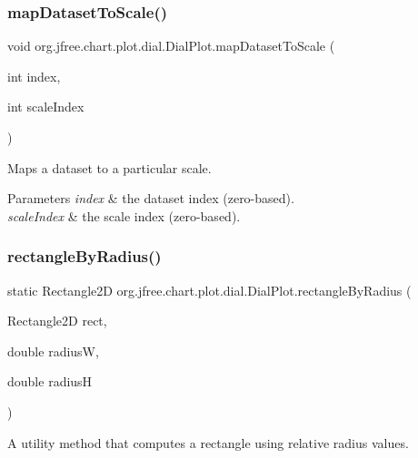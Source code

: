 \subsubsection{\texorpdfstring{map\+Dataset\+To\+Scale()}{mapDatasetToScale()}}
{\footnotesize\ttfamily void org.\+jfree.\+chart.\+plot.\+dial.\+Dial\+Plot.\+map\+Dataset\+To\+Scale (\begin{DoxyParamCaption}\item[{int}]{index,  }\item[{int}]{scale\+Index }\end{DoxyParamCaption})}

Maps a dataset to a particular scale.


\begin{DoxyParams}{Parameters}
{\em index} & the dataset index (zero-\/based). \\
\hline
{\em scale\+Index} & the scale index (zero-\/based). \\
\hline
\end{DoxyParams}
\mbox{\label{classorg_1_1jfree_1_1chart_1_1plot_1_1dial_1_1_dial_plot_ac83736934eac0d509bc7989539196055}} 
\subsubsection{\texorpdfstring{rectangle\+By\+Radius()}{rectangleByRadius()}}
{\footnotesize\ttfamily static Rectangle2D org.\+jfree.\+chart.\+plot.\+dial.\+Dial\+Plot.\+rectangle\+By\+Radius (\begin{DoxyParamCaption}\item[{Rectangle2D}]{rect,  }\item[{double}]{radiusW,  }\item[{double}]{radiusH }\end{DoxyParamCaption})\hspace{0.3cm}{\ttfamily [static]}}

A utility method that computes a rectangle using relative radius values.


